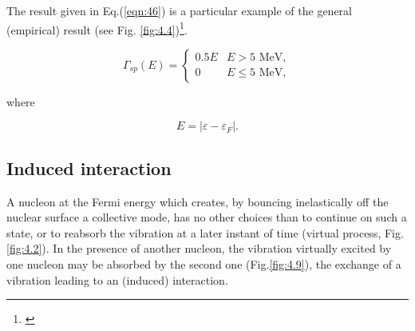 The result given in Eq.(\ref{eqn:46}) is a particular example of the general (empirical) result (see Fig. \ref{fig:4.4})\footnote{\cite{Bertsch:83}}.

\begin{equation}
\Gamma_{sp} (E) =
  \begin{cases}
    0.5 E & \text{$E>5$ MeV}, \\
    0     & \text{$E \leq 5$ MeV},
  \end{cases}
\label{eqn:47}
\end{equation}

\noindent where

\begin{equation}
E = |\varepsilon - \varepsilon_F| .
\label{eqn:48}
\end{equation}

\subsection{Induced interaction}

A nucleon at the Fermi energy which creates, by bouncing inelastically off the nuclear surface a collective mode, has no other choices than to continue on such a state, or to reabsorb the vibration at a later instant of time (virtual process, Fig. \ref{fig:4.2}). In the presence of another nucleon, the vibration virtually excited by one nucleon may be absorbed by the second one (Fig.\ref{fig:4.9}), the exchange of a vibration leading to an (induced) interaction.

